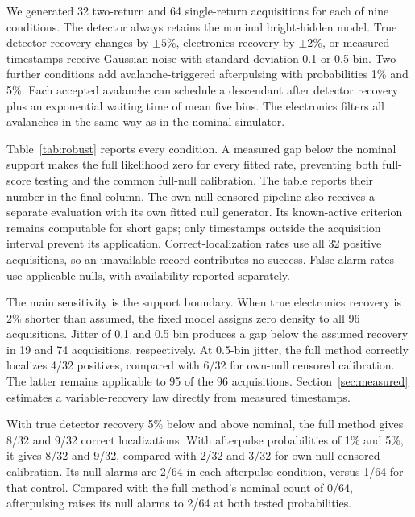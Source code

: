 We generated 32 two-return and 64 single-return acquisitions for each of nine conditions. The detector always retains the nominal bright-hidden model. True detector recovery changes by $\pm5\%$, electronics recovery by $\pm2\%$, or measured timestamps receive Gaussian noise with standard deviation 0.1 or 0.5 bin. Two further conditions add avalanche-triggered afterpulsing with probabilities 1\% and 5\%. Each accepted avalanche can schedule a descendant after detector recovery plus an exponential waiting time of mean five bins. The electronics filters all avalanches in the same way as in the nominal simulator.

Table~\ref{tab:robust} reports every condition. A measured gap below the nominal support makes the full likelihood zero for every fitted rate, preventing both full-score testing and the common full-null calibration. The table reports their number in the final column. The own-null censored pipeline also receives a separate evaluation with its own fitted null generator. Its known-active criterion remains computable for short gaps; only timestamps outside the acquisition interval prevent its application. Correct-localization rates use all 32 positive acquisitions, so an unavailable record contributes no success. False-alarm rates use applicable nulls, with availability reported separately.

The main sensitivity is the support boundary. When true electronics recovery is 2\% shorter than assumed, the fixed model assigns zero density to all 96 acquisitions. Jitter of 0.1 and 0.5 bin produces a gap below the assumed recovery in 19 and 74 acquisitions, respectively. At 0.5-bin jitter, the full method correctly localizes 4/32 positives, compared with 6/32 for own-null censored calibration. The latter remains applicable to 95 of the 96 acquisitions. Section~\ref{sec:measured} estimates a variable-recovery law directly from measured timestamps.

With true detector recovery 5\% below and above nominal, the full method gives 8/32 and 9/32 correct localizations. With afterpulse probabilities of 1\% and 5\%, it gives 8/32 and 9/32, compared with 2/32 and 3/32 for own-null censored calibration. Its null alarms are 2/64 in each afterpulse condition, versus 1/64 for that control. Compared with the full method's nominal count of 0/64, afterpulsing raises its null alarms to 2/64 at both tested probabilities.


